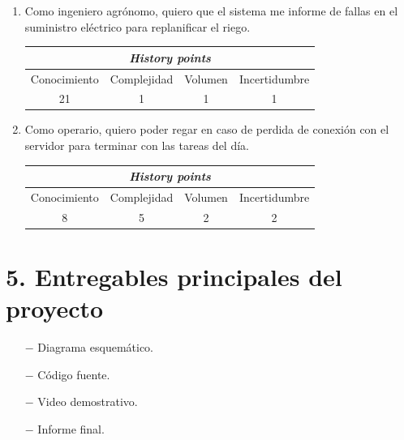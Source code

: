 \documentclass[11pt]{charter}
\begin{document}
\begin{enumerate}
	
	\item Como ingeniero agrónomo, quiero que el sistema me informe de fallas en el suministro eléctrico para replanificar el riego.
	\begin{table}[H]
		\begin{center}
			\begin{tabular}{|c|c|c|c|} \hline
				\multicolumn{4}{|c|}{\textbf{\textit{History points}}} \\\hline
  			Conocimiento & Complejidad & Volumen & Incertidumbre \\\hline
    			  21 	   &     1       &   1     &      1        \\\hline
			\end{tabular}
		\end{center}
	\end{table}

	

	\item Como operario, quiero poder regar en caso de perdida de conexión con el servidor para terminar con las tareas del día.
	\begin{table}[H]
		\begin{center}
			\begin{tabular}{|c|c|c|c|} \hline
				\multicolumn{4}{|c|}{\textbf{\textit{History points}}} \\\hline
  			Conocimiento & Complejidad & Volumen & Incertidumbre \\\hline
    			  8 	   &     5       &   2     &      2        \\\hline
			\end{tabular}
		\end{center}
	\end{table}


\end{enumerate}


\section{5. Entregables principales del proyecto}
\label{sec:entregables}

\begin{itemize}
\item[$-$] Diagrama esquemático.
\item[$-$] Código fuente.
\item[$-$] Video demostrativo.
\item[$-$] Informe final.

\end{itemize}
\end{document}
